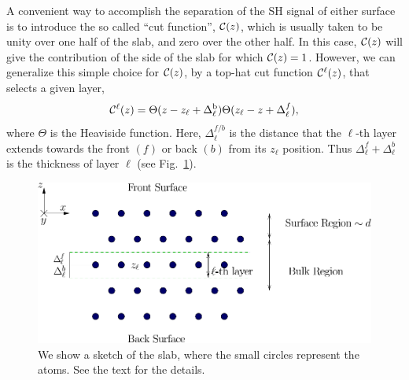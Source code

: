 \documentclass[floatfix,prb,aps,superscriptaddress,11pt,preprint]{revtex4}
\begin{document}
A convenient way to accomplish the separation of the SH signal of
either surface is to introduce
the so called
``cut function'', ${\mathbf{\cal C}}(z)$, which is usually taken to be unity over one half
of the slab, and zero over the other half.
In this case, ${\mathbf{\cal C}}(z)$ will give the contribution of the side of the
slab for which ${\mathbf{\cal C}}(z)=1$. However, we can generalize this simple choice
for ${\mathbf{\cal C}}(z)$, 
by a top-hat cut function
${\mathbf{\cal C}}^\ell(z)$, that selects a given layer,
\begin{equation}
\label{sz}
{\mathbf{\cal C}}^\ell(z)=\Theta(z-z_\ell+\Delta_\ell^{\mathrm{b}})
            \Theta(z_\ell-z+\Delta_\ell^f),
\end{equation}
where $\Theta$ is the Heaviside function. Here, $\Delta_\ell^{f/b}$
is the distance that the $\ell$-th layer extends towards the front
$(f)$ or back $(b)$ from its $z_\ell$ position.  Thus
$\Delta_\ell^f+\Delta_\ell^b$ is the thickness of layer $\ell$
(see Fig.~\ref{fslab}).
\begin{figure}[b]
\centering
\includegraphics[scale=.7]{images/slab}
\caption{
We show a sketch of the slab, where the small
circles represent the atoms. See the text for the details.
}
\label{fslab}
\end{figure}
\end{document}
